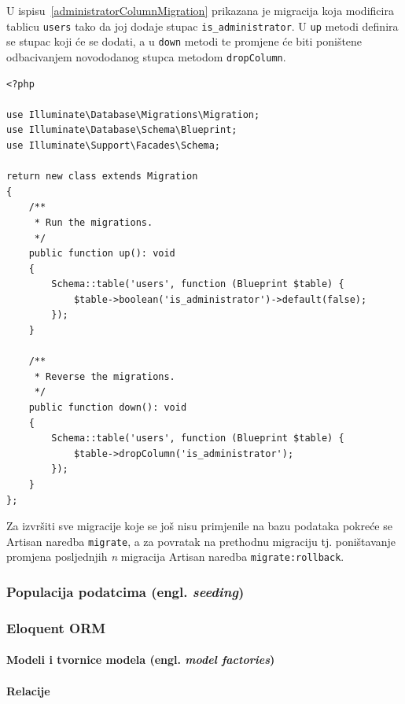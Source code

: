U ispisu~\ref{administratorColumnMigration} prikazana je migracija koja modificira tablicu \texttt{users} tako da joj dodaje stupac \texttt{is\_administrator}. U \texttt{up} metodi definira se stupac koji će se dodati, a u \texttt{down} metodi te promjene će biti poništene odbacivanjem novododanog stupca metodom \texttt{dropColumn}.

\begin{lstlisting}[caption={Migracija za dodavanje stupca \texttt{is\_administrator} u tablicu \texttt{users}}, label=administratorColumnMigration]
<?php

use Illuminate\Database\Migrations\Migration;
use Illuminate\Database\Schema\Blueprint;
use Illuminate\Support\Facades\Schema;

return new class extends Migration
{
    /**
     * Run the migrations.
     */
    public function up(): void
    {
        Schema::table('users', function (Blueprint $table) {
            $table->boolean('is_administrator')->default(false);
        });
    }

    /**
     * Reverse the migrations.
     */
    public function down(): void
    {
        Schema::table('users', function (Blueprint $table) {
            $table->dropColumn('is_administrator');
        });
    }
};

\end{lstlisting}

Za izvršiti sve migracije koje se još nisu primjenile na bazu podataka pokreće se Artisan naredba \texttt{migrate}, a za povratak na prethodnu migraciju tj. poništavanje promjena posljednjih \textit{n} migracija Artisan naredba \texttt{migrate:rollback}.

\subsubsection{Populacija podatcima (engl. \textit{seeding})}

\subsubsection{Eloquent ORM}

\paragraph{Modeli i tvornice modela (engl. \textit{model factories})}

\paragraph{Relacije}

